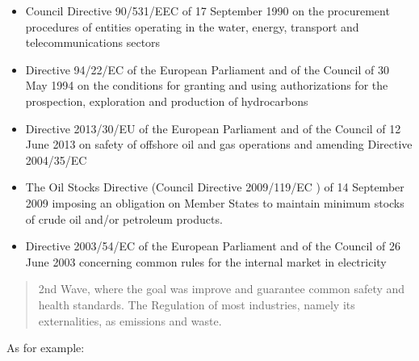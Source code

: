 \documentclass[]{book}
\theoremstyle{definition}
\theoremstyle{definition}
\theoremstyle{definition}
\theoremstyle{remark}
\begin{document}
\begin{itemize}
\item
  Council Directive 90/531/EEC of 17 September 1990 on the procurement
  procedures of entities operating in the water, energy, transport and
  telecommunications sectors
\item
  Directive 94/22/EC of the European Parliament and of the Council of 30
  May 1994 on the conditions for granting and using authorizations for
  the prospection, exploration and production of hydrocarbons
\item
  Directive 2013/30/EU of the European Parliament and of the Council of
  12 June 2013 on safety of offshore oil and gas operations and amending
  Directive 2004/35/EC
\item
  The Oil Stocks Directive (Council Directive 2009/119/EC ) of 14
  September 2009 imposing an obligation on Member States to maintain
  minimum stocks of crude oil and/or petroleum products.
\item
  Directive 2003/54/EC of the European Parliament and of the Council of
  26 June 2003 concerning common rules for the internal market in
  electricity
\end{itemize}

\begin{quote}
2nd Wave, where the goal was improve and guarantee common safety and
health standards. The Regulation of most industries, namely its
externalities, as emissions and waste.
\end{quote}

As for example:
\end{document}
